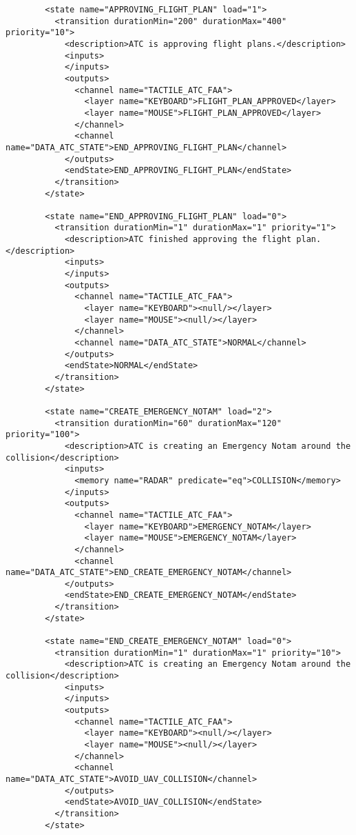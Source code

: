 \begin{verbatim}
        <state name="APPROVING_FLIGHT_PLAN" load="1">
          <transition durationMin="200" durationMax="400" priority="10">
            <description>ATC is approving flight plans.</description>
            <inputs>
            </inputs>
            <outputs>
              <channel name="TACTILE_ATC_FAA">
                <layer name="KEYBOARD">FLIGHT_PLAN_APPROVED</layer>
                <layer name="MOUSE">FLIGHT_PLAN_APPROVED</layer>
              </channel>
              <channel name="DATA_ATC_STATE">END_APPROVING_FLIGHT_PLAN</channel>
            </outputs>
            <endState>END_APPROVING_FLIGHT_PLAN</endState>
          </transition>
        </state>
        
        <state name="END_APPROVING_FLIGHT_PLAN" load="0">
          <transition durationMin="1" durationMax="1" priority="1">
            <description>ATC finished approving the flight plan.</description>
            <inputs>
            </inputs>
            <outputs>
              <channel name="TACTILE_ATC_FAA">
                <layer name="KEYBOARD"><null/></layer>
                <layer name="MOUSE"><null/></layer>
              </channel>
              <channel name="DATA_ATC_STATE">NORMAL</channel>
            </outputs>
            <endState>NORMAL</endState>
          </transition>
        </state>
        
        <state name="CREATE_EMERGENCY_NOTAM" load="2">
          <transition durationMin="60" durationMax="120" priority="100">
            <description>ATC is creating an Emergency Notam around the collision</description>
            <inputs>
              <memory name="RADAR" predicate="eq">COLLISION</memory>
            </inputs>
            <outputs>
              <channel name="TACTILE_ATC_FAA">
                <layer name="KEYBOARD">EMERGENCY_NOTAM</layer>
                <layer name="MOUSE">EMERGENCY_NOTAM</layer>
              </channel>
              <channel name="DATA_ATC_STATE">END_CREATE_EMERGENCY_NOTAM</channel>
            </outputs>
            <endState>END_CREATE_EMERGENCY_NOTAM</endState>
          </transition>
        </state>
        
        <state name="END_CREATE_EMERGENCY_NOTAM" load="0">
          <transition durationMin="1" durationMax="1" priority="10">
            <description>ATC is creating an Emergency Notam around the collision</description>
            <inputs>
            </inputs>
            <outputs>
              <channel name="TACTILE_ATC_FAA">
                <layer name="KEYBOARD"><null/></layer>
                <layer name="MOUSE"><null/></layer>
              </channel>
              <channel name="DATA_ATC_STATE">AVOID_UAV_COLLISION</channel>
            </outputs>
            <endState>AVOID_UAV_COLLISION</endState>
          </transition>
        </state>
        

\end{verbatim}
